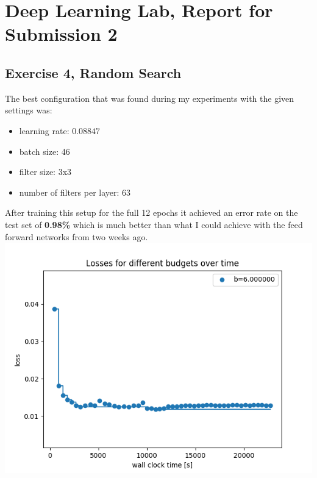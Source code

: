 \documentclass{scrartcl}
\begin{document}
\section*{Deep Learning Lab, Report for Submission 2}

\subsection*{Exercise 4, Random Search}
The best configuration that was found during my experiments with the given settings was:
\begin{itemize}
	\item learning rate: $0.08847$
	\item batch size: 46
	\item filter size: 3x3
	\item number of filters per layer: 63
\end{itemize}
After training this setup for the full 12 epochs it achieved an error rate on the test set of \textbf{0.98\%} which is much better than what I could achieve with the feed forward networks from two weeks ago. \\
\includegraphics[scale=0.7]{random_result.png}
\end{document}
